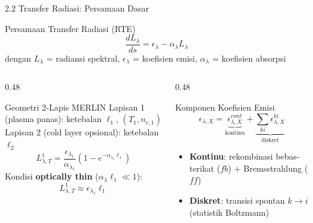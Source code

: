 \documentclass[aspectratio=169, 10pt]{beamer}
\begin{document}
\begin{frame}{2.2 Transfer Radiasi: Persamaan Dasar}
  \begin{block}{Persamaan Transfer Radiasi (RTE)}
    \begin{equation}
      \frac{dL_\lambda}{ds} = \epsilon_\lambda - \alpha_\lambda L_\lambda
    \end{equation}
    dengan $L_\lambda$ = radiansi spektral, $\epsilon_\lambda$ = koefisien emisi, $\alpha_\lambda$ = koefisien absorpsi
  \end{block}

  \vspace{4pt}
  \begin{columns}[T]
    \begin{column}{0.48\textwidth}
      \begin{block}{Geometri 2-Lapis MERLIN}
        \small
        Lapisan 1 (plasma panas): ketebalan $\ell_1$, $(T_1, n_{e,1})$\\
        Lapisan 2 (cold layer opsional): ketebalan $\ell_2$
        \begin{equation}
          L_{\lambda,T}^1 = \frac{\epsilon_{\lambda_1}}{\alpha_{\lambda_1}}\left(1-e^{-\alpha_{\lambda_1}\ell_1}\right)
        \end{equation}
        Kondisi \textbf{optically thin} ($\alpha_\lambda \ell_1 \ll 1$):
        \begin{equation}
          L_{\lambda,T}^1 \approx \epsilon_{\lambda_1}\ell_1
        \end{equation}
      \end{block}
    \end{column}
    \begin{column}{0.48\textwidth}
      \begin{block}{Komponen Koefisien Emisi}
        \small
        \begin{equation}
          \epsilon_{\lambda,X} = \underbrace{\epsilon_{\lambda,X}^{cont}}_{\text{kontinu}} + \underbrace{\sum_{ki}\epsilon_{\lambda,X}^{ki}}_{\text{diskret}}
        \end{equation}
        \begin{itemize}
          \item \textbf{Kontinu}: rekombinasi bebas-terikat ($fb$) + Bremsstrahlung ($ff$)
          \item \textbf{Diskret}: transisi spontan $k \to i$ (statistik Boltzmann)
        \end{itemize}
      \end{block}
    \end{column}
  \end{columns}
\end{frame}
\end{document}
